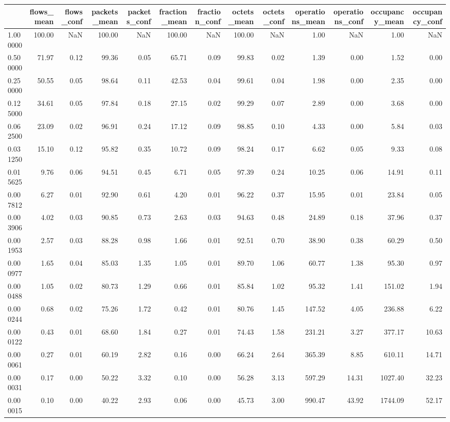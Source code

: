 \begin{tabular}{lrrrrrrrrrrrr}
\toprule
 & flows_mean & flows_conf & packets_mean & packets_conf & fraction_mean & fraction_conf & octets_mean & octets_conf & operations_mean & operations_conf & occupancy_mean & occupancy_conf \\
\midrule
1.000000 & 100.00 & NaN & 100.00 & NaN & 100.00 & NaN & 100.00 & NaN & 1.00 & NaN & 1.00 & NaN \\
0.500000 & 71.97 & 0.12 & 99.36 & 0.05 & 65.71 & 0.09 & 99.83 & 0.02 & 1.39 & 0.00 & 1.52 & 0.00 \\
0.250000 & 50.55 & 0.05 & 98.64 & 0.11 & 42.53 & 0.04 & 99.61 & 0.04 & 1.98 & 0.00 & 2.35 & 0.00 \\
0.125000 & 34.61 & 0.05 & 97.84 & 0.18 & 27.15 & 0.02 & 99.29 & 0.07 & 2.89 & 0.00 & 3.68 & 0.00 \\
0.062500 & 23.09 & 0.02 & 96.91 & 0.24 & 17.12 & 0.09 & 98.85 & 0.10 & 4.33 & 0.00 & 5.84 & 0.03 \\
0.031250 & 15.10 & 0.12 & 95.82 & 0.35 & 10.72 & 0.09 & 98.24 & 0.17 & 6.62 & 0.05 & 9.33 & 0.08 \\
0.015625 & 9.76 & 0.06 & 94.51 & 0.45 & 6.71 & 0.05 & 97.39 & 0.24 & 10.25 & 0.06 & 14.91 & 0.11 \\
0.007812 & 6.27 & 0.01 & 92.90 & 0.61 & 4.20 & 0.01 & 96.22 & 0.37 & 15.95 & 0.01 & 23.84 & 0.05 \\
0.003906 & 4.02 & 0.03 & 90.85 & 0.73 & 2.63 & 0.03 & 94.63 & 0.48 & 24.89 & 0.18 & 37.96 & 0.37 \\
0.001953 & 2.57 & 0.03 & 88.28 & 0.98 & 1.66 & 0.01 & 92.51 & 0.70 & 38.90 & 0.38 & 60.29 & 0.50 \\
0.000977 & 1.65 & 0.04 & 85.03 & 1.35 & 1.05 & 0.01 & 89.70 & 1.06 & 60.77 & 1.38 & 95.30 & 0.97 \\
0.000488 & 1.05 & 0.02 & 80.73 & 1.29 & 0.66 & 0.01 & 85.84 & 1.02 & 95.32 & 1.41 & 151.02 & 1.94 \\
0.000244 & 0.68 & 0.02 & 75.26 & 1.72 & 0.42 & 0.01 & 80.76 & 1.45 & 147.52 & 4.05 & 236.88 & 6.22 \\
0.000122 & 0.43 & 0.01 & 68.60 & 1.84 & 0.27 & 0.01 & 74.43 & 1.58 & 231.21 & 3.27 & 377.17 & 10.63 \\
0.000061 & 0.27 & 0.01 & 60.19 & 2.82 & 0.16 & 0.00 & 66.24 & 2.64 & 365.39 & 8.85 & 610.11 & 14.71 \\
0.000031 & 0.17 & 0.00 & 50.22 & 3.32 & 0.10 & 0.00 & 56.28 & 3.13 & 597.29 & 14.31 & 1027.40 & 32.23 \\
0.000015 & 0.10 & 0.00 & 40.22 & 2.93 & 0.06 & 0.00 & 45.73 & 3.00 & 990.47 & 43.92 & 1744.09 & 52.17 \\

\end{tabular}
